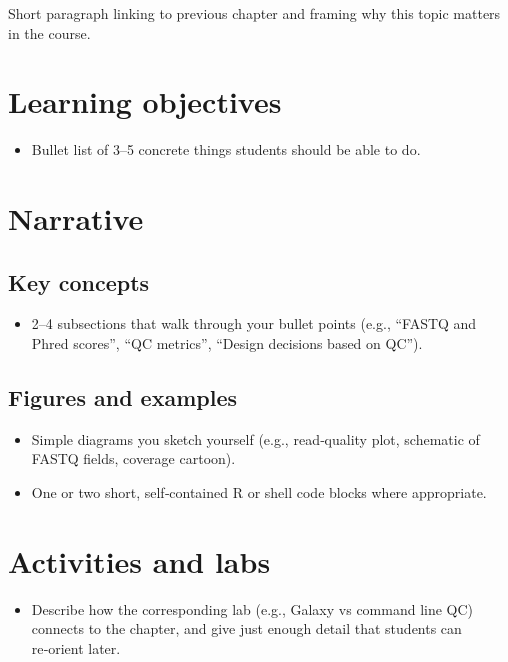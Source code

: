 \documentclass[
  letterpaper,
  DIV=11,
  numbers=noendperiod]{scrreprt}
\providecommand{\tightlist}{%
  \setlength{\itemsep}{0pt}\setlength{\parskip}{0pt}}
\begin{document}
Short paragraph linking to previous chapter and framing why this topic
matters in the course.

\section{Learning objectives}\label{learning-objectives-9}

\begin{itemize}
\tightlist
\item
  Bullet list of 3--5 concrete things students should be able to do.
\end{itemize}

\section{Narrative}\label{narrative-9}

\subsection{Key concepts}\label{key-concepts-9}

\begin{itemize}
\tightlist
\item
  2--4 subsections that walk through your bullet points (e.g., ``FASTQ
  and Phred scores'', ``QC metrics'', ``Design decisions based on QC'').
\end{itemize}

\subsection{Figures and examples}\label{figures-and-examples-9}

\begin{itemize}
\tightlist
\item
  Simple diagrams you sketch yourself (e.g., read‑quality plot,
  schematic of FASTQ fields, coverage cartoon).
\item
  One or two short, self‑contained R or shell code blocks where
  appropriate.
\end{itemize}

\section{Activities and labs}\label{activities-and-labs-9}

\begin{itemize}
\tightlist
\item
  Describe how the corresponding lab (e.g., Galaxy vs command line QC)
  connects to the chapter, and give just enough detail that students can
  re‑orient later.
\end{itemize}
\end{document}
